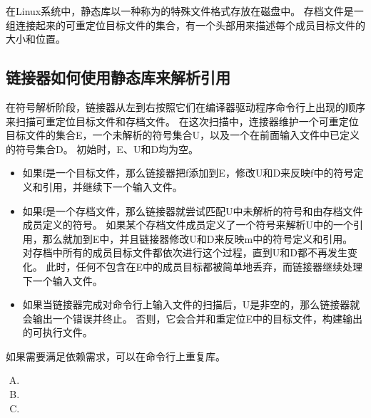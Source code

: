{{        在Linux系统中，静态库以一种称为的特殊文件格式存放在磁盘中。
        存档文件是一组连接起来的可重定位目标文件的集合，有一个头部用来描述每个成员目标文件的大小和位置。
    }

    \subsection{链接器如何使用静态库来解析引用}
    {
        在符号解析阶段，链接器从左到右按照它们在编译器驱动程序命令行上出现的顺序来扫描可重定位目标文件和存档文件。
        在这次扫描中，连接器维护一个可重定位目标文件的集合E，一个未解析的符号集合U，以及一个在前面输入文件中已定义的符号集合D。
        初始时，E、U和D均为空。

        \begin{itemize}
            \item 如果f是一个目标文件，那么链接器把f添加到E，修改U和D来反映f中的符号定义和引用，并继续下一个输入文件。
            \item
            {
                如果f是一个存档文件，那么链接器就尝试匹配U中未解析的符号和由存档文件成员定义的符号。
                如果某个存档文件成员定义了一个符号来解析U中的一个引用，那么就加到E中，并且链接器修改U和D来反映m中的符号定义和引用。
                对存档中所有的成员目标文件都依次进行这个过程，直到U和D都不再发生变化。
                此时，任何不包含在E中的成员目标都被简单地丢弃，而链接器继续处理下一个输入文件。
            }
            \item
            {
                如果当链接器完成对命令行上输入文件的扫描后，U是非空的，那么链接器就会输出一个错误并终止。
                否则，它会合并和重定位E中的目标文件，构建输出的可执行文件。
            }
        \end{itemize}

        如果需要满足依赖需求，可以在命令行上重复库。

        \begin{practicec}
            \begin{enumerate}[A.]
                \item {}
                \item {}
                \item {}
            \end{enumerate}
        \end{practicec}
    }
}
